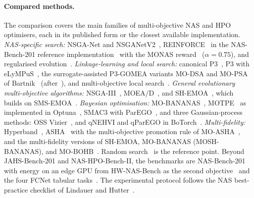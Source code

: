 
\paragraph{Compared methods.} The comparison covers the main families of multi-objective NAS and HPO optimisers,
each in its published form or the closest available implementation. \emph{NAS-specific search:} NSGA-Net and
NSGANetV2~\citep{lu2019nsganet,lu2020nsganetv2}, REINFORCE~\citep{williams1992reinforce,zoph2017nas} in the
NAS-Bench-201 reference implementation~\citep{dong2020nasbench201} with the MONAS reward~\citep{hsu2018monas} ($\alpha = 0.75$), and regularised evolution~\citep{real2019regularized}.
\emph{Linkage-learning and local search:} canonical P3~\citep{goldman2014parameterless}, P3 with
eLyMPuS~\citep{przewozniczek2026lympus}, the surrogate-assisted P3-GOMEA variants MO-DSA and MO-PSA of
Bartnik~\citep{bartnik2026evolutionary} (after~\citep{dushatskiy2021novelsurrogateassistedevolutionaryalgorithm}), and
multi-objective local search~\citep{denottelander2021localsearch}. \emph{General evolutionary multi-objective
algorithms:} NSGA-III~\citep{deb2014nsga3}, MOEA/D~\citep{zhang2007moead}, and SH-EMOA~\citep{guerreroviu2021bagofbaselines},
which builds on SMS-EMOA~\citep{beume2007smsemoa}. \emph{Bayesian optimisation:} MO-BANANAS~\citep{guerreroviu2021bagofbaselines,white2021bananas},
MOTPE~\citep{ozaki2022motpe} as implemented in Optuna~\citep{akiba2019optuna}, SMAC3 with
ParEGO~\citep{lindauer2022smac3,knowles2006parego}, and three Gaussian-process methods: OSS
Vizier~\citep{song2022ossvizier,song2024vizier}, and qNEHVI and qParEGO in BoTorch~\citep{daulton2021qnehvi,daulton2020qehvi,balandat2020botorch}.
\emph{Multi-fidelity:} Hyperband~\citep{li2018hyperband}, ASHA~\citep{li2020asha} with the multi-objective promotion
rule of MO-ASHA~\citep{schmucker2021moasha}, and the multi-fidelity versions of SH-EMOA, MO-BANANAS (MOSH-BANANAS),
and MO-BOHB~\citep{guerreroviu2021bagofbaselines,falkner2018bohb}. Random search~\citep{bergstra2012random} is the
reference point. Beyond JAHS-Bench-201 and NAS-HPO-Bench-II, the benchmarks are NAS-Bench-201 with energy on an
edge GPU from HW-NAS-Bench as the second objective~\citep{dong2020nasbench201,li2021hwnasbench} and the four FCNet
tabular tasks~\citep{klein2019tabular}. The experimental protocol follows the NAS best-practice
checklist of Lindauer and Hutter~\citep{lindauer2020bestpractices}.
